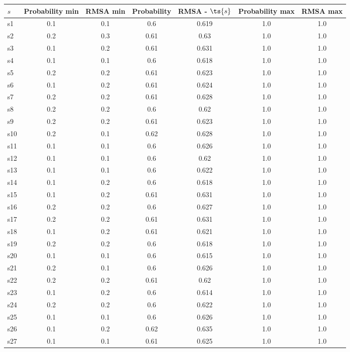 \documentclass{article}
\begin{document}
\noindent\begin{tabular}{|l|c|c|c|c|c|c|}
\hline
$s$& Probability min & RMSA min & Probability & RMSA - $\ts{s}$ & Probability max & RMSA max\\
\hline
s1 &0.1 & 0.1 & 0.6 & 0.619 & 1.0 & 1.0\\
\hline
s2 &0.2 & 0.3 & 0.61 & 0.63 & 1.0 & 1.0\\
\hline
s3 &0.1 & 0.2 & 0.61 & 0.631 & 1.0 & 1.0\\
\hline
s4 &0.1 & 0.1 & 0.6 & 0.618 & 1.0 & 1.0\\
\hline
s5 &0.2 & 0.2 & 0.61 & 0.623 & 1.0 & 1.0\\
\hline
s6 &0.1 & 0.2 & 0.61 & 0.624 & 1.0 & 1.0\\
\hline
s7 &0.2 & 0.2 & 0.61 & 0.628 & 1.0 & 1.0\\
\hline
s8 &0.2 & 0.2 & 0.6 & 0.62 & 1.0 & 1.0\\
\hline
s9 &0.2 & 0.2 & 0.61 & 0.623 & 1.0 & 1.0\\
\hline
s10 &0.2 & 0.1 & 0.62 & 0.628 & 1.0 & 1.0\\
\hline
s11 &0.1 & 0.1 & 0.6 & 0.626 & 1.0 & 1.0\\
\hline
s12 &0.1 & 0.1 & 0.6 & 0.62 & 1.0 & 1.0\\
\hline
s13 &0.1 & 0.1 & 0.6 & 0.622 & 1.0 & 1.0\\
\hline
s14 &0.1 & 0.2 & 0.6 & 0.618 & 1.0 & 1.0\\
\hline
s15 &0.1 & 0.2 & 0.61 & 0.631 & 1.0 & 1.0\\
\hline
s16 &0.2 & 0.2 & 0.6 & 0.627 & 1.0 & 1.0\\
\hline
s17 &0.2 & 0.2 & 0.61 & 0.631 & 1.0 & 1.0\\
\hline
s18 &0.1 & 0.2 & 0.61 & 0.621 & 1.0 & 1.0\\
\hline
s19 &0.2 & 0.2 & 0.6 & 0.618 & 1.0 & 1.0\\
\hline
s20 &0.1 & 0.1 & 0.6 & 0.615 & 1.0 & 1.0\\
\hline
s21 &0.2 & 0.1 & 0.6 & 0.626 & 1.0 & 1.0\\
\hline
s22 &0.2 & 0.2 & 0.61 & 0.62 & 1.0 & 1.0\\
\hline
s23 &0.1 & 0.2 & 0.6 & 0.614 & 1.0 & 1.0\\
\hline
s24 &0.2 & 0.2 & 0.6 & 0.622 & 1.0 & 1.0\\
\hline
s25 &0.1 & 0.1 & 0.6 & 0.626 & 1.0 & 1.0\\
\hline
s26 &0.1 & 0.2 & 0.62 & 0.635 & 1.0 & 1.0\\
\hline
s27 &0.1 & 0.1 & 0.61 & 0.625 & 1.0 & 1.0\\

\end{tabular}
\end{document}
